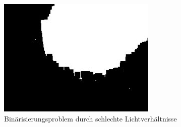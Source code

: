 \documentclass[12pt,toc=bib,toc=listof]{scrreprt}
\begin{document}
\begin{figure}[h]
\begin{minipage}[t]{.2\linewidth}
  \includegraphics[width=\linewidth]{./../bilder/prob3_bad_bin}
  \caption{Binärisierungsproblem durch schlechte Lichtverhältnisse}
  \label{fig:bv_prob3}
\end{minipage}
\end{figure}
\end{document}
